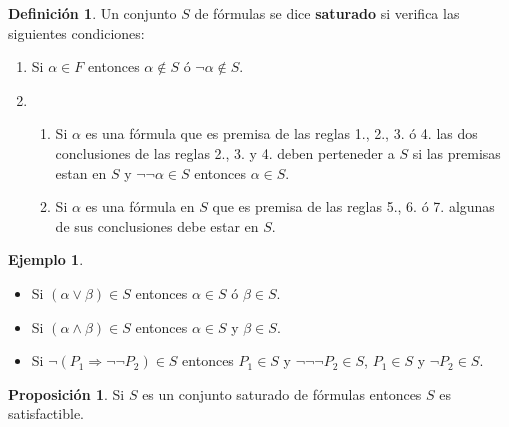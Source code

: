 \documentclass[a4paper,11pt]{article}
\theoremstyle{definition}
\newtheorem{defn}{Definición}[section]
\newtheorem{exap}{Ejemplo}[section]
\newtheorem{prop}{Proposición}[section]
\theoremstyle{remark}
\begin{document}
\begin{defn}
	Un conjunto $S$ de fórmulas se dice \textbf{saturado} si verifica las siguientes condiciones:
	
	\begin{enumerate}
		\item Si $\alpha \in F$ entonces $\alpha \not\in S$ ó $\lnot\alpha \not\in S$.
		
		\item 
			\begin{enumerate}
				\item 
				Si $\alpha$ es una fórmula que es premisa de las reglas 1., 2., 3. ó 4. las dos conclusiones
				de las reglas 2., 3. y 4. deben perteneder a $S$ si las premisas estan en $S$ y 
				$\lnot\lnot\alpha \in S$ entonces $\alpha \in S$.
				
				\item Si $\alpha$ es una fórmula en $S$ que es premisa de las reglas 5., 6. ó 7. algunas
				de sus conclusiones debe estar en $S$.
			\end{enumerate}
	\end{enumerate}
\end{defn}

\begin{exap}
	\begin{itemize}
		\item Si $(\alpha \vee \beta) \in S$ entonces $\alpha \in S$ ó $\beta \in S$.
		
		\item Si $(\alpha \wedge \beta) \in S$ entonces $\alpha \in S$ y $\beta \in S$.
		
		\item Si $\lnot(P_1 \Rightarrow \lnot\lnot P_2) \in S$ entonces $P_1 \in S$ y $\lnot\lnot\lnot P_2 \in S$,
		$P_1  \in S$ y $\lnot P_2 \in S$.
	\end{itemize}
\end{exap}

\begin{prop}
	Si $S$ es un conjunto saturado de fórmulas entonces $S$ es satisfactible.
\end{prop}
\end{document}
